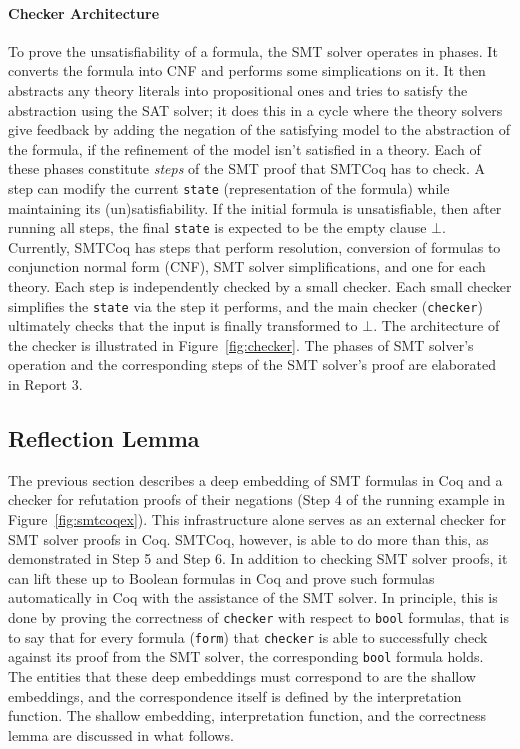\documentclass[11pt]{article}
\begin{document}
	\paragraph{Checker Architecture}
	To prove the unsatisfiability of a 
	formula, the SMT solver operates in 
	phases. It converts the formula into
	CNF and performs some simplications
	on it. It then abstracts any theory
	literals into propositional ones 
	and tries to satisfy the abstraction 
	using the SAT solver; it does this
	in a cycle where the theory
	solvers give feedback
	by adding the negation of the 
	satisfying model to the 
	abstraction of the formula, if the 
	refinement of the model isn't 
	satisfied in a theory. 
	Each of these phases constitute
	\textit{steps} of the SMT proof
	that SMTCoq has to check. A step
	can modify the current 
	\texttt{state} (representation of 
	the formula) while maintaining 
	its (un)satisfiability. If the 
	initial formula is unsatisfiable, 
	then after running all steps,
	the final \texttt{state} is expected
	to be the empty clause $\bot$. 
	Currently, SMTCoq has steps that 
	perform resolution, conversion of 
	formulas to conjunction normal 
	form (CNF), SMT solver 
	simplifications, and one for 
	each theory. Each step is 
	independently checked by a small 
	checker. Each small
	checker simplifies the  
	\texttt{state} via the step it 
	performs, and the main checker 
	(\texttt{checker}) ultimately checks 
	that the input is 
	finally transformed to $\bot$. The 
	architecture of the checker is 
	illustrated in
	Figure~\ref{fig:checker}. The phases 
	of SMT solver's operation and the 
	corresponding steps of the
	SMT solver's proof are elaborated
	in Report 3.
	
	\subsection{Reflection Lemma}
	\label{sec:refl}
	The previous section describes a 
	deep embedding of SMT formulas 
	in Coq and a checker for 
	refutation proofs of their 
	negations (Step 4 of 
	the running example in 
	Figure~\ref{fig:smtcoqex}). 
	This infrastructure alone serves 
	as an external checker for 
	SMT solver proofs in Coq.
	SMTCoq, however, is able to 
	do more than this, as demonstrated
	in Step 5 and Step 6. In addition 
	to checking SMT solver proofs, 
	it can lift these up to 
	Boolean formulas in Coq and
	prove such formulas automatically
	in Coq with the assistance of 
	the SMT solver. In principle,
	this is done by proving the
	correctness of \texttt{checker}
	with respect to \texttt{bool}
	formulas, that is to say that 
	for every formula (\texttt{form})
	that \texttt{checker} is able to 
	successfully check against its
	proof from the SMT solver, the 
	corresponding \texttt{bool}
	formula holds. The entities
	that these deep embeddings 
	must correspond to are the shallow
	embeddings, and the correspondence 
	itself is defined by the 
	interpretation function. The 
	shallow embedding, interpretation
	function, and the correctness 
	lemma are discussed in what
	follows.
	
\end{document}
